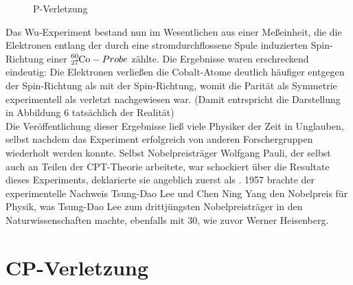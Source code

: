 \documentclass[12pt,a4paper]{scrartcl}
\numberwithin{equation}{section}
\begin{document}
\begin{figure} [!ht]
\centering
{}
\caption{P-Verletzung}
\end{figure}
Das Wu-Experiment bestand nun im Wesentlichen aus einer Meßeinheit, die die Elektronen entlang der durch eine stromdurchflossene Spule induzierten Spin-Richtung einer $\ce{^{60}_{27}Co}-Probe$ zählte. Die Ergebnisse waren erschreckend eindeutig: Die Elektronen verließen die Cobalt-Atome deutlich häufiger entgegen der Spin-Richtung als mit der Spin-Richtung, womit die Parität als Symmetrie experimentell als verletzt nachgewiesen war. (Damit entrspricht die Darstellung in Abbildung 6 tatsächlich der Realität)\cite{wu57} \\
Die Veröffentlichung dieser Ergebnisse ließ viele Physiker der Zeit in Unglauben, selbst nachdem das Experiment erfolgreich von anderen Forschergruppen wiederholt werden konnte. Selbst Nobelpreisträger Wolfgang Pauli, der selbst auch an Teilen der CPT-Theorie arbeitete, war schockiert über die Resultate dieses Experiments, deklarierte sie angeblich zuerst als \grqq{}. 1957 brachte der experimentelle Nachweis Tsung-Dao Lee und Chen Ning Yang den Nobelpreis für Physik, was Tsung-Dao Lee zum drittjüngsten Nobelpreisträger in den Naturwissenschaften machte, ebenfalls mit 30, wie zuvor Werner Heisenberg.

  \newpage  %

  \section{CP-Verletzung}
\end{document}
